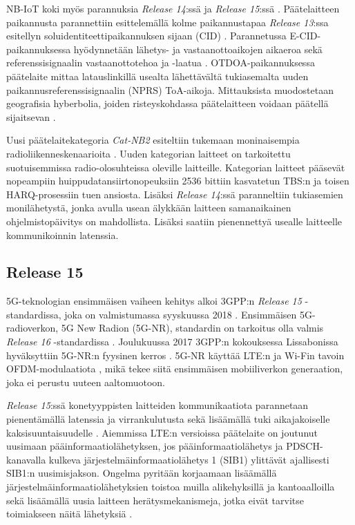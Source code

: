 \documentclass[finnish, 12pt, a4paper, elec, latin1, utf8, online]{aaltothesis}
\begin{document}
NB-IoT koki myös parannuksia \textit{Release 14}:ssä ja \textit{Release 15}:ssä \cite{release15}. Päätelaitteen paikannusta parannettiin esittelemällä kolme paikannustapaa \textit{Release 13}:ssa esitellyn soluidentiteettipaikannuksen sijaan (CID) \cite{ratasuk2017enhancements}. Parannetussa E-CID-paikannuksessa hyödynnetään lähetys- ja vastaanottoaikojen aikaeroa sekä referenssisignaalin vastaanottotehoa ja -laatua \cite{hoglund2017overview}. OTDOA-paikannuksessa päätelaite mittaa latauslinkillä usealta lähettävältä tukiasemalta uuden paikannusreferenssisignaalin (NPRS) ToA-aikoja. Mittauksista muodostetaan geografisia hyberbolia, joiden risteyskohdassa päätelaitteen voidaan päätellä sijaitsevan \cite{hoglund2017overview}.

Uusi päätelaitekategoria \textit{Cat-NB2} esiteltiin tukemaan moninaisempia radioliikenneskenaarioita \cite{hoglund2017overview}. Uuden kategorian laitteet on tarkoitettu suotuisemmissa radio-olosuhteissa oleville laitteille. Kategorian laitteet pääsevät nopeampiin huippudatansiirtonopeuksiin 2536 bittiin kasvatetun TBS:n ja toisen HARQ-prosessiin tuen ansiosta. Lisäksi \textit{Release 14}:ssä paranneltiin tukiasemien monilähetystä, jonka avulla usean älykkään laitteen samanaikainen ohjelmistopäivitys on mahdollista. Lisäksi saatiin pienennettyä usealle laitteelle kommunikoinnin latenssia.

\subsection{Release 15}

5G-teknologian ensimmäisen vaiheen kehitys alkoi 3GPP:n \textit{Release 15} -standardissa, joka on valmistumassa syyskuussa 2018 \cite{release15}. Ensimmäisen 5G-radioverkon, 5G New Radion (5G-NR), standardin on tarkoitus olla valmis \textit{Release 16} -standardissa \cite{release16}. Joulukuussa 2017 3GPP:n kokouksessa Lissabonissa hyväksyttiin 5G-NR:n fyysinen kerros \cite{5GNRSpecs,TS38211}. 5G-NR käyttää LTE:n ja Wi-Fin tavoin OFDM-modulaatiota \cite{TS38211}, mikä tekee siitä ensimmäisen mobiiliverkon generaation, joka ei perustu uuteen aaltomuotoon.

\textit{Release 15}:ssä konetyyppisten laitteiden kommunikaatiota parannetaan pienentämällä latenssia ja virrankulutusta sekä lisäämällä tuki aikajakoiselle kaksisuuntaisuudelle \cite{ratasuk2017enhancements}. Aiemmissa LTE:n versioissa päätelaite on joutunut uusimaan pääinformaatiolähetyksen, jos pääinformaatiolähetys ja PDSCH-kanavalla kulkeva järjestelmäinformaatiolähetys 1 (SIB1) ylittävät ajallisesti SIB1:n uusimisjakson. Ongelma pyritään korjaamaan lisäämällä järjestelmäinformaatiolähetyksien toistoa muilla alikehyksillä ja kantoaalloilla sekä lisäämällä uusia laitteen herätysmekanismeja, jotka eivät tarvitse toimiakseen näitä lähetyksiä \cite{ratasuk2017enhancements}.
\end{document}
